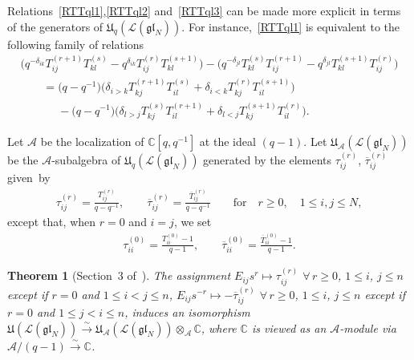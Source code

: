 \documentclass[11pt]{article}
\newtheorem{theorem}{Theorem}
\numberwithin{theorem}{section}
\numberwithin{proposition}{section}
\numberwithin{lemma}{section}
\numberwithin{corollary}{section}
\numberwithin{definition}{section}
\numberwithin{example}{section}
\numberwithin{remark}{section}
\numberwithin{note}{section}
\numberwithin{equation}{section}
\begin{document}
Relations~\eqref{RTTql1},\eqref{RTTql2} and~\eqref{RTTql3} can be made more explicit in terms of the generators of
$\mathfrak{U}_q(\mathcal{L}(\mathfrak{gl}_N))$.
For instance,~\eqref{RTTql1} is equivalent to the following family of relations
\begin{gather}
\big(q^{-\delta_{ik}} T_{ij}^{(r+1)} T_{kl}^{(s)} - q^{\delta_{ik}}T_{ij}^{(r)} T_{kl}^{(s+1)}\big) - \big(q^{-\delta_{jl}}
T_{kl}^{(s)} T_{ij}^{(r+1)} - q^{\delta_{jl}} T_{kl}^{(s+1)} T_{ij}^{(r)}\big)
\nonumber
\\
\qquad{}
= \big(q-q^{-1}\big) \big(\delta_{i>k} T_{kj}^{(r+1)} T_{il}^{(s)} + \delta_{i<k} T_{kj}^{(r)} T_{il}^{(s+1)}\big)
\nonumber\\
\qquad\phantom{=}
- \big(q-q^{-1}\big)\big(\delta_{l>j} T_{kj}^{(s)} T_{il}^{(r+1)} + \delta_{l<j} T_{kj}^{(s+1)} T_{il}^{(r)}\big).
\label{RTTql12}
\end{gather}

Let $\mathcal{A}$ be the localization of $\mathbb{C}[q,q^{-1}]$ at the ideal $(q-1)$.
Let $\mathfrak{U}_{\mathcal{A}}(\mathcal{L}(\mathfrak{gl}_N))$ be the $\mathcal{A}$-subalgebra of
$\mathfrak{U}_q(\mathcal{L}(\mathfrak{gl}_N))$ generated by the elements $ \tau_{ij}^{(r)}$,
$\overline{\tau}_{ij}^{(r)}$ given~by
\begin{gather*}
\tau_{ij}^{(r)} = \frac{T_{ij}^{(r)}}{q-q^{-1}},
\qquad
\overline{\tau}_{ij}^{(r)} = \frac{\overline{T}_{ij}^{(r)}}{q-q^{-1}}
\qquad\text{for}\quad r\ge 0,\quad 1\le i,j \le N,
\end{gather*}
except that, when $r=0$ and $i=j$, we set
\begin{gather*}
\tau_{ii}^{(0)} = \frac{T_{ii}^{(0)}-1}{q-1}, \qquad \overline{\tau}_{ii}^{(0)} = \frac{\overline{T}_{ii}^{(0)}-1}{q-1}.
\end{gather*}

\begin{theorem}[Section~3 of~\cite{MRS}]
\label{qlim}
The assignment $E_{ij} s^r \mapsto \tau_{ij}^{(r)}$ $\forall\, r\ge 0$, $1\le i$, $j\le n$ except if $r=0$ and $1\le i<j\le n$,
$E_{ij} s^{-r} \mapsto -\overline{\tau}_{ij}^{(r)}$ $\forall\, r\ge 0$, $1\le i$, $j\le n$ except if $r=0$ and $1\le j<i\le n$,
induces an isomorphism $\mathfrak{U}(\mathcal{L}(\mathfrak{gl}_N)) \stackrel{\sim}{\longrightarrow}
\mathfrak{U}_{\mathcal{A}}(\mathcal{L}(\mathfrak{gl}_N)) \otimes_{\mathcal{A}} \mathbb{C}$, where $\mathbb{C}$
is viewed as an $\mathcal{A}$-module via $\mathcal{A}/(q-1) \stackrel{\sim}{\longrightarrow} \mathbb{C}$.
\end{theorem}
\end{document}
